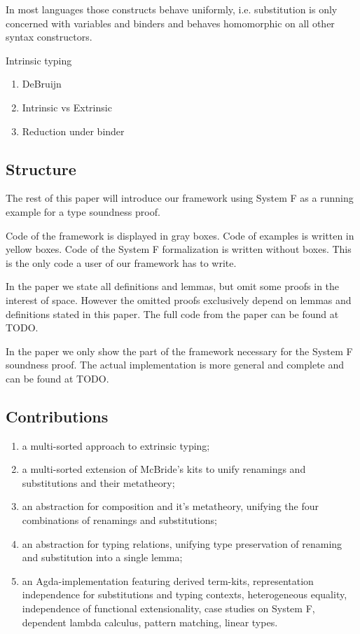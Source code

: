 \documentclass[sigplan,10pt]{acmart}
\begin{document}
  In most languages those constructs behave uniformly,
  i.e. substitution is only concerned with variables and binders and
  behaves homomorphic on all other syntax constructors.

  Intrinsic typing 


  \begin{enumerate}
  \item DeBruijn
  \item Intrinsic vs Extrinsic
  \item Reduction under binder
  \end{enumerate}

  \subsection{Structure}
  The rest of this paper will introduce our framework using System F
  as a running example for a type soundness proof.

  Code of the framework is displayed in gray boxes.
  Code of examples is written in yellow boxes.
  Code of the System F formalization is written without boxes. This is
  the only code a user of our framework has to write.

  In the paper we state all definitions and lemmas, but omit some proofs
  in the interest of space. However the omitted proofs exclusively
  depend on lemmas and definitions stated in this paper. The full code
  from the paper can be found at TODO.

  In the paper we only show the part of the framework necessary for
  the System F soundness proof. The actual implementation is more
  general and complete and can be found at TODO.

  \subsection{Contributions}
  \begin{enumerate}
  \item
    a multi-sorted approach to extrinsic typing;
  \item
    a multi-sorted extension of McBride's kits to unify renamings and substitutions and their metatheory;
  \item
    an abstraction for composition and it's metatheory, unifying the four combinations of renamings and substitutions;
  \item
    an abstraction for typing relations, unifying type preservation of renaming and substitution into a single lemma;
  \item
    an Agda-implementation featuring derived term-kits, representation
    independence for substitutions and typing contexts, heterogeneous
    equality, independence of functional extensionality, case studies
    on System F, dependent lambda calculus, pattern matching, linear
    types.
  \end{enumerate}
\end{document}
